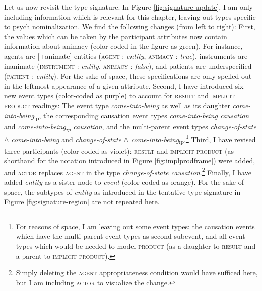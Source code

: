 Let us now revisit the type signature. In Figure \ref{fig:signature-update}, I am only including information which is relevant for this chapter, leaving out types specific to psych nominalization. We find the following changes (from left to right): 
First, the values which can be taken by the participant attributes now contain information about animacy (color-coded in the figure as green). For instance, agents are [+animate] entities (\textsc{agent :} \textit{entity}, \textsc{animacy :} \textit{true}), instruments are inanimate (\textsc{instrument :} \textit{entity}, \textsc{animacy :} \textit{false}), and patients are underspecified (\textsc{patient :} \textit{entity}). For the sake of space, these specifications are only spelled out in the leftmost appearance of a given attribute.
Second, I have introduced six new event types (color-coded as purple) to account for \textsc{result} and \textsc{implicit product} readings: The event type \textit{come-into-being} as well as its daughter \textit{come-into-being}\textsubscript{ip}, the corresponding causation event types \textit{come-into-being causation} and \textit{come-into-being\textsubscript{ip} causation}, and the multi-parent event types \textit{change-of-state} $\wedge$ \textit{come-into-being} and \textit{change-of-state} $\wedge$ \textit{come-into-being}\textsubscript{ip}.\footnote{For reasons of space, I am leaving out some event types: the causation events which have the multi-parent event types as second subevent, and all event types which would be needed to model \textsc{product} (as a daughter to \textsc{result} and a parent to \textsc{implicit product}).} 
Third, I have revised three participants (color-coded as violet): \textsc{result} and \textsc{implicit product} (as shorthand for the notation introduced in Figure \ref{fig:implprodframe}) were added, and \textsc{actor} replaces \textsc{agent} in the type \textit{change-of-state causation}.\footnote{Simply deleting the \textsc{agent} appropriateness condition would have sufficed here, but I am including \textsc{actor} to visualize the change.}
Finally, I have added \textit{entity} as a sister node to \textit{event} (color-coded as orange). For the sake of space, the subtypes of \textit{entity} as introduced in the tentative type signature in Figure \ref{fig:signature-region} are not repeated here.

